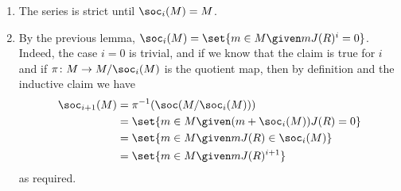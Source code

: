 \begin{enumerate}
	\item The series is strict until $\soc_i(M) = M$.
	\item By the previous lemma, $\soc_i(M) = \set{m \in M\given mJ(R)^i = 0}$.
		Indeed, the case $i = 0$ is trivial, and if we know that the claim is
		true for $i$ and if $\pi\colon M\to M/\soc_i(M)$ is the quotient map,
		then by definition and the inductive claim we have
		\begin{align*}
			\soc_{i+1}(M) &= \pi^{-1}(\soc(M/\soc_i(M)))\\
			&= \set{m \in M\given (m + \soc_i(M))J(R) = 0}\\
			&= \set{m \in M\given mJ(R) \in \soc_i(M)}\\
			&= \set{m \in M\given mJ(R)^{i+1}}
		\end{align*}
		as required.
\end{enumerate}
